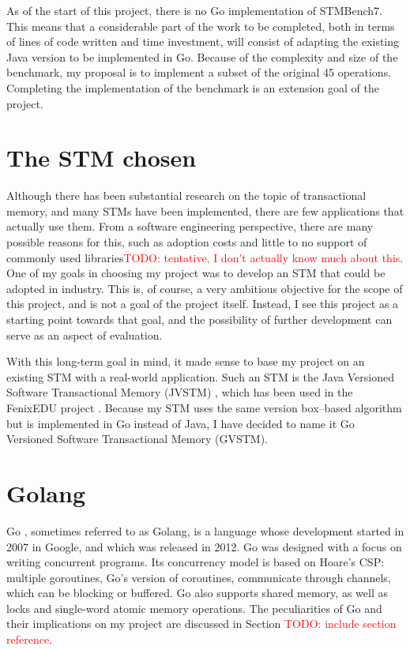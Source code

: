 \documentclass[12pt,a4paper,oneside,openright]{report}
\newcommand{\todo}[1]{\textcolor{red}{TODO: #1}}
\begin{document}
As of the start of this project, there is no Go implementation of
STMBench7. This means that a considerable part of the work to be
completed, both in terms of lines of code written and time investment,
will consist of adapting the existing Java version to be implemented
in Go. Because of the complexity and size of the benchmark, my
proposal is to implement a subset of the original 45
operations. Completing the implementation of the benchmark is an
extension goal of the project.

\section{The STM chosen}
\label{sec:stm-chosen}

Although there has been substantial research on the topic of
transactional memory, and many STMs have been implemented, there are
few applications that actually use them. From a software engineering
perspective, there are many possible reasons for this, such as
adoption costs and little to no support of commonly used
libraries\todo{tentative, I don't actually know much about this}. One
of my goals in choosing my project was to develop an STM that could be
adopted in industry. This is, of course, a very ambitious objective
for the scope of this project, and is not a goal of the project
itself. Instead, I see this project as a starting point towards that
goal, and the possibility of further development can serve as an
aspect of evaluation.

With this long-term goal in mind, it made sense to base my project on
an existing STM with a real-world application. Such an STM is the Java
Versioned Software Transactional Memory (JVSTM) \cite{jvstm}, which
has been used in the FenixEDU project
\cite{carvalho2008versioned}. Because my STM uses the same version
box--based algorithm \cite{VBox} but is implemented in Go instead of
Java, I have decided to name it Go Versioned Software Transactional
Memory (GVSTM).

\section{Golang}
\label{sec:intro:golang}

Go \cite{Go}, sometimes referred to as Golang, is a language whose
development started in 2007 in Google, and which was released in
2012. Go was designed with a focus on writing concurrent programs. Its
concurrency model is based on Hoare's CSP: multiple goroutines, Go's
version of coroutines, communicate through channels, which can be
blocking or buffered. Go also supports shared memory, as well as locks
and single-word atomic memory operations. The peculiarities of Go and
their implications on my project are discussed in Section
\todo{include section reference}.
\end{document}
